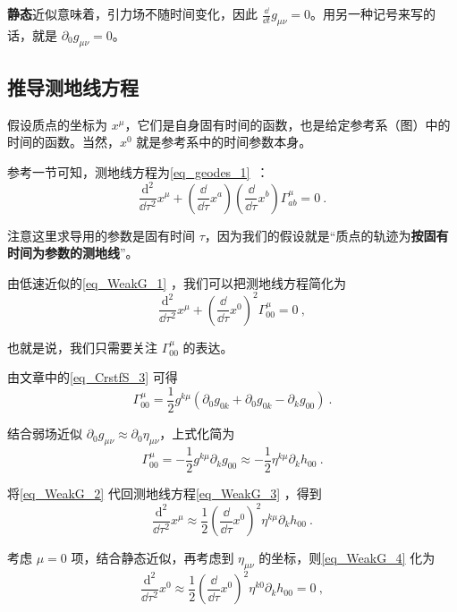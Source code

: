 \textbf{静态}近似意味着，引力场不随时间变化，因此 $\frac{\dd}{\dd t}g_{\mu\nu}=0$。用另一种记号来写的话，就是 $\partial_0g_{\mu\nu}=0$。

\subsection{推导测地线方程}

假设质点的坐标为 $x^\mu$，它们是自身固有时间的函数，也是给定参考系（图）中的时间的函数。当然，$x^0$ 就是参考系中的时间参数本身。

参考一节可知，测地线方程为\autoref{eq_geodes_1}~：
\begin{equation}
\frac{\mathrm{d}^2}{\dd\tau^2}x^\mu+(\frac{\dd}{\dd\tau}x^a)(\frac{\dd}{\dd\tau}x^b)\Gamma^\mu_{ab}=0~.
\end{equation}

注意这里求导用的参数是固有时间 $\tau$，因为我们的假设就是“质点的轨迹为\textbf{按固有时间为参数的测地线}”。

由低速近似的\autoref{eq_WeakG_1} ，我们可以把测地线方程简化为
\begin{equation}\label{eq_WeakG_3}
\frac{\mathrm{d}^2}{\dd\tau^2}x^\mu+(\frac{\dd}{\dd\tau}x^0)^2\Gamma^\mu_{00}=0~,
\end{equation}

也就是说，我们只需要关注 $\Gamma^\mu_{00}$ 的表达。

由文章中的\autoref{eq_CrstfS_3} 可得
\begin{equation}
\Gamma^\mu_{00}=\frac{1}{2}g^{k\mu}(\partial_0g_{0k}+\partial_0g_{0k}-\partial_{k}g_{00})~.
\end{equation}

结合弱场近似 $\partial_0g_{\mu\nu}\approx\partial_0\eta_{\mu\nu}$，上式化简为
\begin{equation}\label{eq_WeakG_2}
\Gamma^\mu_{00}=-\frac{1}{2}g^{k\mu}\partial_{k}g_{00}\approx-\frac{1}{2}\eta^{k\mu}\partial_{k}h_{00}~.
\end{equation}

将\autoref{eq_WeakG_2} 代回测地线方程\autoref{eq_WeakG_3} ，得到
\begin{equation}\label{eq_WeakG_4}
\frac{\mathrm{d}^2}{\dd\tau^2}x^\mu\approx\frac{1}{2}(\frac{\dd}{\dd\tau}x^0)^2\eta^{k\mu}\partial_{k}h_{00}~.
\end{equation}

考虑 $\mu=0$ 项，结合静态近似，再考虑到 $\eta_{\mu\nu}$ 的坐标，则\autoref{eq_WeakG_4} 化为
\begin{equation}
\frac{\mathrm{d}^2}{\dd\tau^2}x^0\approx\frac{1}{2}(\frac{\dd}{\dd\tau}x^0)^2\eta^{k0}\partial_{k}h_{00}=0~,
\end{equation}


